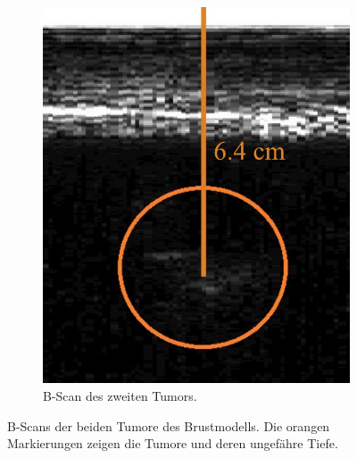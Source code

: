 \begin{figure}
\begin{subfigure}{0.4\textwidth}
    \includegraphics[width=\textwidth]{content/tumor2.pdf}
    \caption{B-Scan des zweiten Tumors.}
    \label{fig:tumor2}
\end{subfigure}     
  \caption{B-Scans der beiden Tumore des Brustmodells. Die orangen Markierungen zeigen die Tumore und deren ungefähre Tiefe.}
  \label{fig:figures}
\end{figure}
